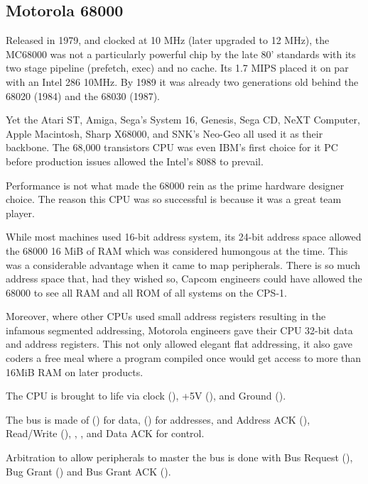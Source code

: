 \subsection{Motorola 68000}

 Released in 1979, and clocked at 10 MHz (later upgraded to 12 MHz), the MC68000 was not a particularly powerful chip by the late 80' standards with its two stage pipeline\cite{M68000fv} (prefetch, exec) and no cache. Its 1.7 MIPS placed it on par with an Intel 286 10MHz. By 1989 it was already two generations old behind the 68020 (1984) and the 68030 (1987).

Yet the Atari ST, Amiga, Sega's System 16, Genesis, Sega CD, NeXT Computer, Apple Macintosh, Sharp X68000, and SNK's Neo-Geo all used it as their backbone. The 68,000 transistors CPU was even IBM's first choice for it PC before production issues allowed the Intel's 8088 to prevail\cite{ieee20170630}. 

Performance is not what made the 68000 rein as the prime hardware designer choice. The reason this CPU was so successful is because it was a great team player.

While most machines used 16-bit address system, its 24-bit address space allowed the 68000 16 MiB of RAM which was considered humongous at the time. This was a considerable advantage when it came to map peripherals. There is so much address space that, had they wished so, Capcom engineers could have allowed the 68000 to see all RAM and all ROM of all systems on the CPS-1.

Moreover, where other CPUs used small address registers resulting in the infamous segmented addressing, Motorola engineers gave their CPU 32-bit data and address registers. This not only allowed elegant flat addressing, it also gave coders a free meal where a program compiled once would get access to more than 16MiB RAM on later products. 





The CPU is brought to life via clock (), +5V (), and Ground ().

The bus is made of () for data, (\icode{A1-A23]}) for addresses, and Address ACK (), Read/Write (), , , and Data ACK  for control.


Arbitration to allow peripherals to master the bus is done with Bus Request (),  Bug Grant () and Bus Grant ACK ().

